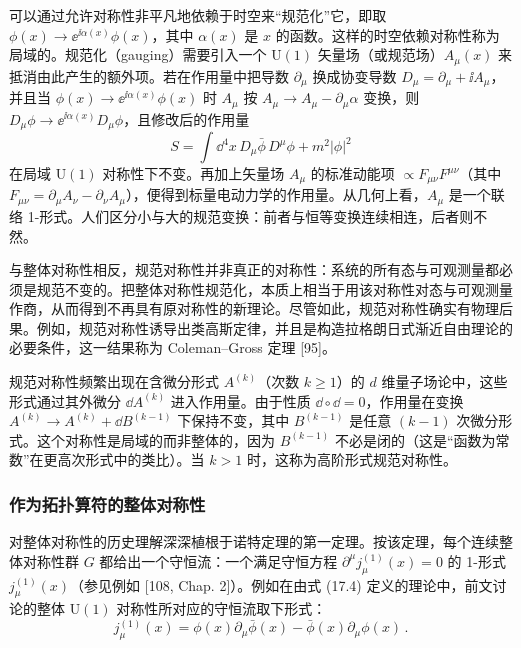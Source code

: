 可以通过允许对称性非平凡地依赖于时空来“规范化”它，即取 $\phi(x)\to\ee^{\ii\alpha(x)}\phi(x)$，其中 $\alpha(x)$ 是 $x$ 的函数。这样的时空依赖对称性称为局域的。规范化（gauging）需要引入一个 $\mathrm{U}(1)$ 矢量场（或规范场）$A_\mu(x)$ 来抵消由此产生的额外项。若在作用量中把导数 $\partial_\mu$ 换成协变导数 $D_\mu=\partial_\mu+\ii A_\mu$，并且当 $\phi(x)\to\ee^{\ii\alpha(x)}\phi(x)$ 时 $A_\mu$ 按 $A_\mu\to A_\mu-\partial_\mu\alpha$ 变换，则 $D_\mu\phi\to\ee^{\ii\alpha(x)}D_\mu\phi$，且修改后的作用量
\[
S=\int \dd^4x\,D_\mu\bar\phi\,D^\mu\phi+m^2|\phi|^2
\]
在局域 $\mathrm{U}(1)$ 对称性下不变。再加上矢量场 $A_\mu$ 的标准动能项 $\propto F_{\mu\nu}F^{\mu\nu}$（其中 $F_{\mu\nu}=\partial_\mu A_\nu-\partial_\nu A_\mu$），便得到标量电动力学的作用量。从几何上看，$A_\mu$ 是一个联络 1-形式。人们区分小与大的规范变换：前者与恒等变换连续相连，后者则不然。


与整体对称性相反，规范对称性并非真正的对称性：系统的所有态与可观测量都必须是规范不变的。把整体对称性规范化，本质上相当于用该对称性对态与可观测量作商，从而得到不再具有原对称性的新理论。尽管如此，规范对称性确实有物理后果。例如，规范对称性诱导出类高斯定律，并且是构造拉格朗日式渐近自由理论的必要条件，这一结果称为 Coleman–Gross 定理 [95]。

\begin{remark}[17.9] 规范对称性频繁出现在含微分形式 $A^{(k)}$（次数 $k\ge 1$）的 $d$ 维量子场论中，这些形式通过其外微分 $\dd A^{(k)}$ 进入作用量。由于性质 $\dd\circ\dd=0$，作用量在变换 $A^{(k)}\to A^{(k)}+\dd B^{(k-1)}$ 下保持不变，其中 $B^{(k-1)}$ 是任意 $(k-1)$ 次微分形式。这个对称性是局域的而非整体的，因为 $B^{(k-1)}$ 不必是闭的（这是“函数为常数”在更高次形式中的类比）。当 $k>1$ 时，这称为高阶形式规范对称性。\end{remark}

\subsubsection*{作为拓扑算符的整体对称性}

对整体对称性的历史理解深深植根于诺特定理的第一定理。按该定理，每个连续整体对称性群 $G$ 都给出一个守恒流：一个满足守恒方程 $\partial^\mu j^{(1)}_\mu(x)=0$ 的 1-形式 $j^{(1)}_\mu(x)$（参见例如 [108, Chap. 2]）。例如在由式 (17.4) 定义的理论中，前文讨论的整体 $\mathrm{U}(1)$ 对称性所对应的守恒流取下形式：
\[
j^{(1)}_\mu(x)=\phi(x)\partial_\mu\bar\phi(x)-\bar\phi(x)\partial_\mu\phi(x)\,.
\]

